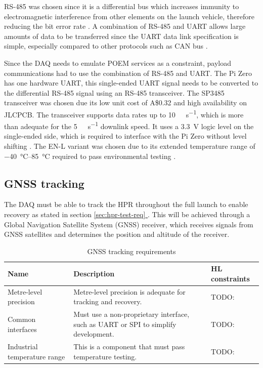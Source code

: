 \documentclass[draft]{report}
\newcommand*{\secref}[1]{section \hyperref[{#1}]{\ref*{#1} \nameref*{#1}}}
\newcommand{\aud}{A\$}
\begin{document}
RS-485 was chosen since it is a differential bus which increases immunity to electromagnetic interference from other elements on the launch vehicle, therefore reducing the bit error rate \cite{cratere2024board}. A combination of RS-485 and UART allows large amounts of data to be transferred since the UART data link specification is simple, especially compared to other protocols such as CAN bus \cite{cratere2024board}.

Since the DAQ needs to emulate POEM services as a constraint, payload communications had to use the combination of RS-485 and UART. The Pi Zero has one hardware UART, this single-ended UART signal needs to be converted to the differential RS-485 signal using an RS-485 transceiver. The SP3485 transceiver was chosen due its low unit cost of \aud 0.32 and high availability on JLCPCB. The transceiver supports data rates up to \SI{10}{\mega\bit\per\second}, which is more than adequate for the \SI{5}{\kilo\bit\per\second} downlink speed. It uses a \SI{3.3}{\volt} logic level on the single-ended side, which is required to interface with the Pi Zero without level shifting \cite{maxlinear2021sp3485}. The EN-L variant was chosen due to its extended temperature range of \SIrange{-40}{85}{\degreeCelsius} required to pass environmental testing \cite{maxlinear2021sp3485}.

\subsection{GNSS tracking}

The DAQ must be able to track the HPR throughout the full launch to enable recovery as stated in \secref{sec:hpr-test-req}. This will be achieved through a Global Navigation Satellite System (GNSS) receiver, which receives signals from GNSS satellites and determines the position and altitude of the receiver.


\begin{table}[H]
  \centering
  \begin{tabular}{|L{0.2\textwidth}|L{0.495\textwidth}|L{0.2\textwidth}|}
    \hline
    \textbf{Name}                & \textbf{Description}                                                               & \textbf{HL constraints} \\ \hline
    Metre-level precision        & Metre-level precision is adequate for tracking and recovery.                       & TODO:                   \\\hline
    Common interfaces            & Must use a non-proprietary interface, such as UART or SPI to simplify development. & TODO:                   \\\hline
    Industrial temperature range & This is a component that must pass temperature testing.                            & TODO:                   \\\hline
  \end{tabular}
  \caption{GNSS tracking requirements}
  \label{tabl:gnss-requirements}
\end{table}
\end{document}
